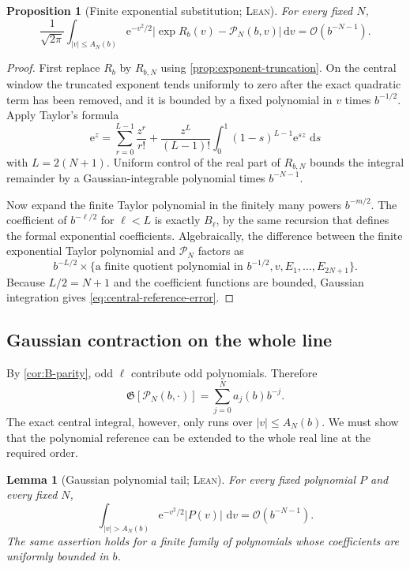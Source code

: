 \documentclass[11pt,oneside]{article}
\newtheorem{proposition}[theorem]{Proposition}
\newtheorem{lemma}[theorem]{Lemma}
\theoremstyle{definition}
\theoremstyle{remark}
\newcommand{\e}{\mathrm e}
\newcommand{\dd}{\,\mathrm d}
\newcommand{\bigO}{\mathcal O}
\newcommand{\Gauss}{\mathfrak G}
\newcommand{\Formalized}{\textsc{Lean}}
\begin{document}
\begin{proposition}[Finite exponential substitution; \Formalized]
\label{prop:finite-exp-substitution}
For every fixed $N$,
\begin{equation}
 \frac1{\sqrt{2\pi}}
 \int_{|v|\leq A_N(b)}
 \e^{-v^2/2}
 \left|\exp R_b(v)-\mathcal P_N(b,v)\right|\dd v
 =\bigO(b^{-N-1}). \label{eq:central-reference-error}
\end{equation}
\end{proposition}

\begin{proof}
First replace $R_b$ by $R_{b,N}$ using
\cref{prop:exponent-truncation}.  On the central window the truncated
exponent tends uniformly to zero after the exact quadratic term has been
removed, and it is bounded by a fixed polynomial in $v$ times
$b^{-1/2}$.  Apply Taylor's formula
\[
 \e^z=\sum_{r=0}^{L-1}\frac{z^r}{r!}
      +\frac{z^L}{(L-1)!}\int_0^1(1-s)^{L-1}\e^{sz}\,\dd s
\]
with $L=2(N+1)$.  Uniform control of the real part of $R_{b,N}$ bounds the
integral remainder by a Gaussian-integrable polynomial times
$b^{-N-1}$.

Now expand the finite Taylor polynomial in the finitely many powers
$b^{-m/2}$.  The coefficient of $b^{-\ell/2}$ for
$\ell<L$ is exactly $B_\ell$, by the same recursion that defines the
formal exponential coefficients.  Algebraically, the difference between
the finite exponential Taylor polynomial and
$\mathcal P_N$ factors as
\[
 b^{-L/2}\times
 \{\text{a finite quotient polynomial in }b^{-1/2},v,
   E_1,\dots,E_{2N+1}\}.
\]
Because $L/2=N+1$ and the coefficient functions are bounded, Gaussian
integration gives \eqref{eq:central-reference-error}.
\end{proof}

\subsection{Gaussian contraction on the whole line}

By \cref{cor:B-parity}, odd $\ell$ contribute odd polynomials.  Therefore
\begin{equation}
 \Gauss[\mathcal P_N(b,\cdot)]
 =\sum_{j=0}^{N}a_j(b)b^{-j}. \label{eq:reference-contraction}
\end{equation}
The exact central integral, however, only runs over
$|v|\leq A_N(b)$.  We must show that the polynomial reference can be
extended to the whole real line at the required order.

\begin{lemma}[Gaussian polynomial tail; \Formalized]
\label{lem:gaussian-polynomial-tail}
For every fixed polynomial $P$ and every fixed $N$,
\[
 \int_{|v|>A_N(b)}\e^{-v^2/2}|P(v)|\,\dd v
 =\bigO(b^{-N-1}).
\]
The same assertion holds for a finite family of polynomials whose
coefficients are uniformly bounded in $b$.
\end{lemma}
\end{document}
